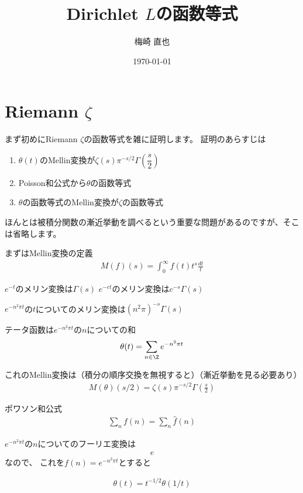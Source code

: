 \documentclass[uplatex, a4paper]{jsarticle}
\title{Dirichlet $L$の函数等式}
\author{梅崎 直也}
\date{\today}                                           %
\begin{document}
\maketitle

\section{Riemann $\zeta$}
まず初めにRiemann $\zeta$の函数等式を雑に証明します。
証明のあらすじは
\begin{enumerate}
\item $\theta(t)$のMellin変換が$\zeta(s)\pi^{-s/2}\Gamma(\dfrac{s}{2})$
\item Poisson和公式から$\theta$の函数等式
\item $\theta$の函数等式のMellin変換が$\zeta$の函数等式
\end{enumerate}
ほんとは被積分関数の漸近挙動を調べるという重要な問題があるのですが、そこは省略します。

まずはMellin変換の定義
\begin{align*}
M(f)(s)=\int^\infty_0f(t)t^{s}\frac{dt}{t}
\end{align*}

\begin{eg}
$e^{-t}$のメリン変換は$\Gamma(s)$
$e^{-ct}$のメリン変換は$c^{-s}\Gamma(s)$

$e^{-n^2\pi t}$の$t$についてのメリン変換は$(n^2\pi)^{-s}\Gamma(s)$
\end{eg}

\begin{dfn}
テータ函数は$e^{-n^2\pi t}$の$n$についての和
\begin{align*}
\theta(t)=\sum_{n\in \Z}e^{-n^2\pi t}
\end{align*}
\end{dfn}

これのMellin変換は（積分の順序交換を無視すると）（漸近挙動を見る必要あり）
\begin{align*}
M(\theta)(s/2)=\zeta(s)\pi^{-s/2}\Gamma(\frac{s}{2})
\end{align*}

ポワソン和公式
\begin{align*}
\sum_nf(n)=\sum_n\hat{f}(n)
\end{align*}

$e^{-n^2\pi t}$の$n$についてのフーリエ変換は
\begin{align*}
e
\end{align*}
なので、
これを$f(n)=e^{-n^2\pi t}$とすると

\begin{align*}
\theta(t)=t^{-1/2}\theta(1/t)
\end{align*}
\end{document}
